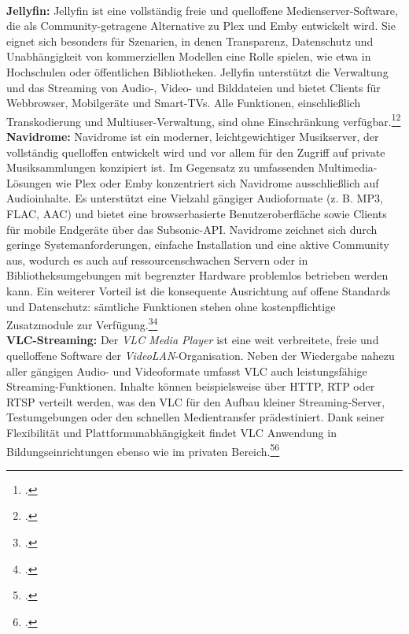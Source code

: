 \documentclass[12pt,a4paper]{report}
\begin{document}
  \\
  \newline
  \textbf{Jellyfin:}
  Jellyfin ist eine vollständig freie und quelloffene Medienserver-Software, die als Community-getragene Alternative zu Plex und Emby entwickelt wird. 
  Sie eignet sich besonders für Szenarien, in denen Transparenz, Datenschutz 
  und Unabhängigkeit von kommerziellen Modellen eine Rolle spielen, wie etwa in Hochschulen oder öffentlichen Bibliotheken. 
  Jellyfin unterstützt die Verwaltung und das Streaming von Audio-, Video- und Bilddateien und bietet Clients für Webbrowser, Mobilgeräte und Smart-TVs. 
  Alle Funktionen, einschließlich Transkodierung und Multiuser-Verwaltung, 
  sind ohne Einschränkung verfügbar.\footcite[Vgl.][]{wikipedia_jellyfin}\footcite[Vgl.][]{jellyfin_docs}
  \\
  \newline
  \textbf{Navidrome:}
  Navidrome ist ein moderner, leichtgewichtiger Musikserver, der vollständig quelloffen entwickelt wird und vor allem für den Zugriff auf private Musiksammlungen konzipiert ist.
  Im Gegensatz zu umfassenden Multimedia-Lösungen wie Plex oder Emby konzentriert sich Navidrome ausschließlich auf Audioinhalte.
  Es unterstützt eine Vielzahl gängiger Audioformate (z. B. MP3, FLAC, AAC) und bietet eine browserbasierte Benutzeroberfläche 
  sowie Clients für mobile Endgeräte über das Subsonic-API.
  Navidrome zeichnet sich durch geringe Systemanforderungen, einfache Installation und eine aktive Community aus, 
  wodurch es auch auf ressourcenschwachen Servern oder in Bibliotheksumgebungen mit begrenzter Hardware problemlos betrieben werden kann.
  Ein weiterer Vorteil ist die konsequente Ausrichtung auf offene Standards 
  und Datenschutz: sämtliche Funktionen stehen ohne kostenpflichtige Zusatzmodule zur Verfügung.\footcite[Vgl.][]{navidrome2024}\footcite[Vgl.][]{wikipedia_navidrome}
  \\
  \newline  
  \textbf{VLC-Streaming:}
  Der \emph{VLC Media Player} ist eine weit verbreitete, freie und quelloffene Software der \emph{VideoLAN}-Organisation. 
  Neben der Wiedergabe nahezu aller gängigen Audio- und Videoformate umfasst VLC auch leistungsfähige Streaming-Funktionen. 
  Inhalte können beispielsweise über HTTP, RTP oder RTSP verteilt werden, was den VLC für den Aufbau kleiner Streaming-Server, 
  Testumgebungen oder den schnellen Medientransfer prädestiniert. 
  Dank seiner Flexibilität und Plattformunabhängigkeit findet VLC Anwendung in Bildungseinrichtungen ebenso wie im privaten Bereich.\footcite[Vgl.][]{wikipedia_vlc}\footcite[Vgl.][]{vlc_docs}  
\end{document}
